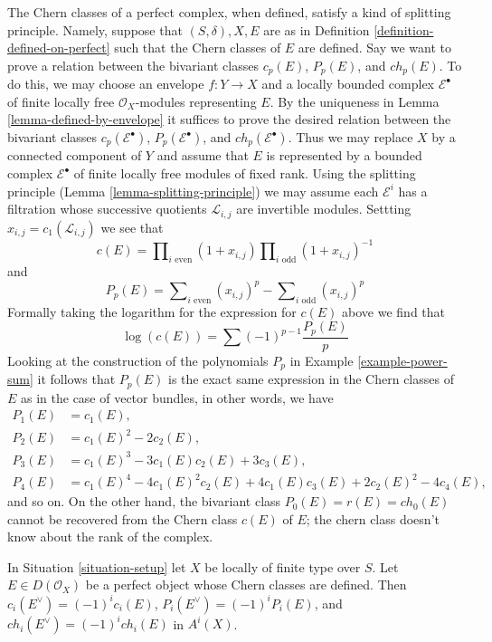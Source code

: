 \begin{remark}
\label{remark-splitting-principle-perfect}
The Chern classes of a perfect complex, when defined, satisfy a kind of
splitting principle. Namely, suppose that $(S, \delta), X, E$ are as in
Definition \ref{definition-defined-on-perfect}
such that the Chern classes of $E$ are defined.
Say we want to prove a relation between the bivariant classes
$c_p(E)$, $P_p(E)$, and $ch_p(E)$. To do this, we may choose an
envelope $f : Y \to X$ and a locally bounded
complex $\mathcal{E}^\bullet$ of finite locally free $\mathcal{O}_X$-modules
representing $E$. By the uniqueness in Lemma \ref{lemma-defined-by-envelope}
it suffices to prove the desired relation between the bivariant classes
$c_p(\mathcal{E}^\bullet)$, $P_p(\mathcal{E}^\bullet)$, and
$ch_p(\mathcal{E}^\bullet)$. Thus we may replace $X$ by a connected
component of $Y$ and assume that $E$ is represented by a bounded
complex $\mathcal{E}^\bullet$ of finite locally free modules of fixed rank.
Using the splitting principle
(Lemma \ref{lemma-splitting-principle}) we may assume each
$\mathcal{E}^i$ has a filtration whose successive
quotients $\mathcal{L}_{i, j}$ are invertible modules.
Settting $x_{i, j} = c_1(\mathcal{L}_{i, j})$ we see that
$$
c(E) =
\prod\nolimits_{i\text{ even}} (1 + x_{i, j})
\prod\nolimits_{i\text{ odd}} (1 + x_{i, j})^{-1}
$$
and
$$
P_p(E) =  \sum\nolimits_{i\text{ even}} (x_{i, j})^p -
\sum\nolimits_{i\text{ odd}} (x_{i, j})^p
$$
Formally taking the logarithm for the expression for $c(E)$ above
we find that
$$
\log(c(E)) = \sum (-1)^{p - 1}\frac{P_p(E)}{p}
$$
Looking at the construction of the polynomials $P_p$ in
Example \ref{example-power-sum} it follows that $P_p(E)$
is the exact same expression in the Chern classes of $E$
as in the case of vector bundles, in other words, we have
\begin{align*}
P_1(E) & = c_1(E), \\
P_2(E) & = c_1(E)^2 - 2c_2(E), \\
P_3(E) & = c_1(E)^3 - 3c_1(E)c_2(E) + 3c_3(E), \\
P_4(E) & = c_1(E)^4 - 4c_1(E)^2c_2(E) + 4c_1(E)c_3(E) + 2c_2(E)^2 - 4c_4(E),
\end{align*}
and so on. On the other hand, the bivariant class $P_0(E) = r(E) = ch_0(E)$
cannot be recovered from the Chern class $c(E)$ of $E$; the chern class
doesn't know about the rank of the complex.
\end{remark}

\begin{lemma}
\label{lemma-chern-classes-perfect-dual}
In Situation \ref{situation-setup} let $X$ be locally of finite type over $S$.
Let $E \in D(\mathcal{O}_X)$ be a perfect object whose Chern classes are
defined. Then $c_i(E^\vee) = (-1)^i c_i(E)$, $P_i(E^\vee) = (-1)^iP_i(E)$,
and $ch_i(E^\vee) = (-1)^ich_i(E)$ in $A^i(X)$.
\end{lemma}

